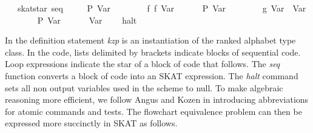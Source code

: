 \documentclass{llncs}
\begin{document}
\begin{isabellebody}
\ \ {}\ skat{}star\ {}seq\isanewline
\ \ \ \ {}\ {}{}P\ {}Var\ {}{}{}\isanewline
\ \ \ \ {}\ {}\ {}{}\ f\ {}f\ {}Var\ {}{}{}\isanewline
\ \ \ \ {}\ P\ {}Var\ {}{}\isanewline
\ \ \ \ {}\ {}\ {}{}\ g\ {}Var\ {}{}\ {}Var\ {}{}\isanewline
\ \ \ \ {}{}\isanewline
\ \ {}\ P\ {}Var\ {}{}\isanewline
\ \ {}\ {}\ {}{}\ Var\ {}\isanewline
\ \ {}\ halt\isanewline
\ \ {}{}\isanewline
\isanewline
\end{isabellebody}

In the definition statement \textit{kzp} is an instantiation of the
ranked alphabet type class. In the code, lists delimited by brackets
indicate blocks of sequential code. Loop expressions indicate the star
of a block of code that follows. The \textit{seq} function converts a
block of code into an SKAT expression. The \textit{halt} command sets
all non output variables used in the scheme to null. To make algebraic
reasoning more efficient, we follow Angus and Kozen in introducing
abbreviations for atomic commands and tests. The flowchart equivalence
problem can then be expressed more succinctly in SKAT as follows.
\end{document}
